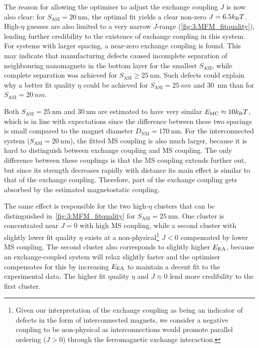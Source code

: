 The reason for allowing the optimiser to adjust the exchange coupling $J$ is now also clear: for $S_\mathrm{ASI} = \SI{20}{\nano\metre}$, the optimal fit yields a clear non-zero $J = 6.5 \kBT$.
High-$\eta$ guesses are also limited to a very narrow $J$-range (\cref{fig:3:MFM_fitquality}), lending further credibility to the existence of exchange coupling in this system.
For systems with larger spacing, a near-zero exchange coupling is found.
This may indicate that manufacturing defects caused incomplete separation of neighbouring nanomagnets in the bottom  layer for the smallest $S_\mathrm{ASI}$, while complete separation was achieved for $S_\mathrm{ASI} \geq \SI{25}{\nano\metre}$.
Such defects could explain why a better fit quality $\eta$ could be achieved for $S_\mathrm{ASI} = \SI{25}{nm}$ and \SI{30}{\nano\metre} than for $S_\mathrm{ASI} = \SI{20}{nm}$. \par
Both $S_\mathrm{ASI} = \SI{25}{\nano\metre}$ and $\SI{30}{\nano\metre}$ are estimated to have very similar $\EMC \approx 10 \kBT$, which is in line with expectations since the difference between these two spacings is small compared to the magnet diameter $D_\mathrm{NM} = \SI{170}{\nano\metre}$.
For the interconnected system ($S_\mathrm{ASI} = \SI{20}{\nano\metre}$), the fitted MS coupling is also much larger, because it is hard to distinguish between exchange coupling and MS coupling.
The only difference between these couplings is that the MS coupling extends further out, but since its strength decreases rapidly with distance its main effect is similar to that of the exchange coupling.
Therefore, part of the exchange coupling gets absorbed by the estimated magnetostatic coupling. \par
The same effect is responsible for the two high-$\eta$ clusters that can be distinguished in~\cref{fig:3:MFM_fitquality} for $S_\mathrm{ASI} = \SI{25}{\nano\metre}$.
One cluster is concentrated near $J=0$ with high MS coupling, while a second cluster with slightly lower fit quality $\eta$ exists at a non-physical\footnote{
	Given our interpretation of the exchange coupling as being an indicator of defects in the form of interconnected magnets, we consider a negative coupling to be non-physical as interconnections would promote parallel ordering ($J > 0$) through the ferromagnetic exchange interaction.
} $J < 0$ compensated by lower MS coupling.
The second cluster also corresponds to slightly higher $E_\mathrm{EA}$, because an exchange-coupled system will relax slightly faster and the optimiser compensates for this by increasing $E_\mathrm{EA}$ to maintain a decent fit to the experimental data.
The higher fit quality $\eta$ and $J \approx 0$ lend more credibility to the first cluster. \\\par

